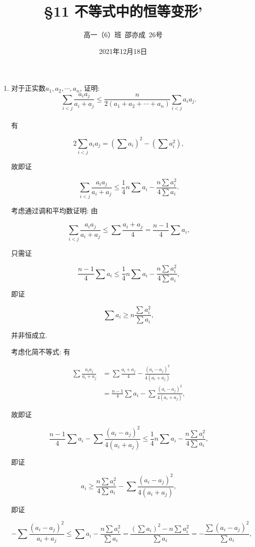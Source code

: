 \documentclass[8pt]{article}
\title{\S 11 不等式中的恒等变形'}
\author{高一（6）班\ 邵亦成\ 26号}
\date{2021年12月18日}
\begin{document}
	\maketitle

	\begin{enumerate}
		\item 对于正实数$a_1, a_2, \cdots, a_n$, 证明: $$\sum_{i<j} \frac{a_i a_j}{a_i + a_j} \leq \frac{n}{2(a_1 + a_2 + \cdots + a_n)} \sum_{i<j} a_i a_j.$$
			~\\

			有

			$$2\sum_{i<j} a_i a_j = \left(\sum a_i\right)^2 - \left(\sum a_i^2\right),$$

			故即证

			$$\sum_{i<j} \frac{a_i a_j}{a_i + a_j} \leq \frac{1}{4} n\sum a_i - \frac{n\sum a_i^2}{4\sum a_i}.$$

			考虑通过调和平均数证明: 由

			$$\sum_{i<j} \frac{a_i a_j}{a_i + a_j} \leq \sum \frac{a_i + a_j}{4} = \frac{n-1}{4} \sum a_i,$$

			只需证

			$$\frac{n-1}{4} \sum a_i \leq \frac{1}{4} n\sum a_i - \frac{n\sum a_i^2}{4 \sum a_i},$$

			即证

			$$\sum a_i \geq n \frac{\sum a_i^2}{\sum a_i},$$

			并非恒成立.

			考虑化简不等式: 有

			\begin{align*}
				\sum \frac{a_i a_j}{a_i + a_j} &= \sum \frac{a_i + a_j}{4} - \frac{(a_i - a_j)^2}{4(a_i + a_j)}\\
				&= \frac{n-1}{4} \sum a_i - \sum \frac{(a_i - a_j)^2}{4(a_i + a_j)},
			\end{align*}

			故即证

			$$\frac{n-1}{4} \sum a_i - \sum \frac{(a_i - a_j)^2}{4(a_i + a_j)} \leq \frac{1}{4} n\sum a_i - \frac{n \sum a_i^2}{4 \sum a_i},$$

			即证

			$$a_i \geq \frac{n \sum a_i^2}{4 \sum a_i} - \sum \frac{(a_i - a_j)^2}{4(a_i + a_j)},$$

			即证

			$$-\sum \frac{(a_i - a_j)^2}{a_i + a_j} \leq \sum a_i - \frac{n \sum a_i^2}{\sum a_i} = \frac{\left(\sum a_i\right)^2 - n \sum a_i^2}{\sum a_i} = - \frac{\sum (a_i - a_j)^2}{\sum a_i},$$


\end{enumerate}
\end{document}
